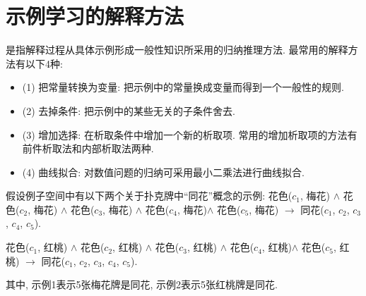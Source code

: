 \section{示例学习的解释方法}
是指解释过程从具体示例形成一般性知识所采用的归纳推理方法. 最常用的解释方法有以下4种:
\begin{itemize}
\item (1) 把常量转换为变量: 把示例中的常量换成变量而得到一个一般性的规则.

\item(2) 去掉条件: 把示例中的某些无关的子条件舍去.

\item(3) 增加选择: 在析取条件中增加一个新的析取项. 常用的增加析取项的方法有前件析取法和内部析取法两种.

\item(4) 曲线拟合: 对数值问题的归纳可采用最小二乘法进行曲线拟合.
\end{itemize}
\begin{example}
假设例子空间中有以下两个关于扑克牌中“同花”概念的示例:
花色($c_1$, 梅花) $\wedge$ 花色($c_2$, 梅花) $\wedge$ 花色($c_3$, 梅花) $\wedge$ 花色($c_4$, 梅花)$\wedge$ 花色($c_5$, 梅花) $\rightarrow$ 同花($c_1$, $c_2$, $c_3$, $c_4$, $c_5$).

花色($c_1$, 红桃) $\wedge$ 花色($c_2$, 红桃) $\wedge$ 花色($c_3$, 红桃) $\wedge$ 花色($c_4$, 红桃)$\wedge$ 花色($c_5$, 红桃) $\rightarrow$ 同花($c_1$, $c_2$, $c_3$, $c_4$, $c_5$).
\end{example}
其中, 示例1表示5张梅花牌是同花, 示例2表示5张红桃牌是同花.

